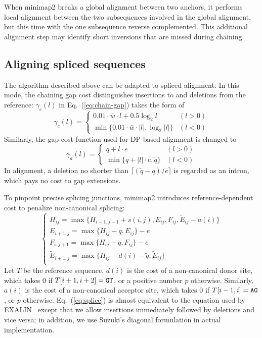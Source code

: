 \documentclass{bioinfo}
\begin{document}
\begin{methods}
When minimap2 breaks a global alignment between two anchors, it performs local
alignment between the two subsequences involved in the global alignment, but
this time with the one subsequence reverse complemented. This additional
alignment step may identify short inversions that are missed during chaining.

\subsection{Aligning spliced sequences}

The algorithm described above can be adapted to spliced alignment. In this
mode, the chaining gap cost distinguishes insertions to and deletions from the
reference: $\gamma_c(l)$ in Eq.~(\ref{eq:chain-gap}) takes the form of
\[
\gamma_c(l)=\left\{\begin{array}{ll}
0.01\cdot\bar{w}\cdot l+0.5\log_2 l & (l>0) \\
\min\{0.01\cdot\bar{w}\cdot|l|,\log_2|l|\} & (l<0)
\end{array}\right.
\]
Similarly, the gap cost function used for DP-based alignment is changed to
\[
\gamma_a(l)=\left\{\begin{array}{ll}
q+l\cdot e & (l>0) \\
\min\{q+|l|\cdot e,\tilde{q}\} & (l<0)
\end{array}\right.
\]
In alignment, a deletion no shorter than $\lceil(\tilde{q}-q)/e\rceil$ is
regarded as an intron, which pays no cost to gap extensions.

To pinpoint precise splicing junctions, minimap2 introduces reference-dependent
cost to penalize non-canonical splicing:
\begin{equation}\label{eq:splice}
\left\{\begin{array}{l}
H_{ij} = \max\{H_{i-1,j-1}+s(i,j),E_{ij},F_{ij},\tilde{E}_{ij}-a(i)\}\\
E_{i+1,j}= \max\{H_{ij}-q,E_{ij}\}-e\\
F_{i,j+1}= \max\{H_{ij}-q,F_{ij}\}-e\\
\tilde{E}_{i+1,j}= \max\{H_{ij}-d(i)-\tilde{q},\tilde{E}_{ij}\}\\
\end{array}\right.
\end{equation}
Let $T$ be the reference sequence. $d(i)$ is the cost of a non-canonical donor
site, which takes 0 if $T[i+1,i+2]={\tt GT}$, or a positive number $p$
otherwise. Similarly, $a(i)$ is the cost of a non-canonical acceptor site, which
takes 0 if $T[i-1,i]={\tt AG}$, or $p$ otherwise. Eq.~(\ref{eq:splice}) is
almost equivalent to the equation used by EXALIN~\citep{Zhang:2006aa} except
that we allow insertions immediately followed by deletions and vice versa; in
addition, we use Suzuki's diagonal formulation in actual implementation.


\end{methods}
\end{document}
